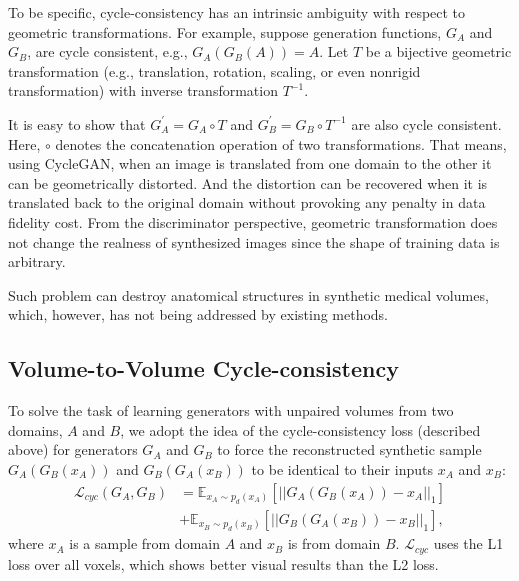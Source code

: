 \documentclass[10pt,twocolumn,letterpaper]{article}
\begin{document}
To be specific, cycle-consistency has an intrinsic ambiguity with respect to geometric transformations.
For example, suppose generation functions, $G_A$ and $G_B$, are cycle consistent, e.g., $G_A(G_B(A)) = A$.
Let $T$ be a bijective geometric transformation (e.g., translation, rotation, scaling, or even nonrigid transformation) with inverse transformation $T^{-1}$.

It is easy to show that $G_A^{'} = G_A \circ T$ and $G_B^{'} = G_B \circ T^{-1}$ are also cycle consistent.
Here, $\circ$ denotes the concatenation operation of two transformations.
That means, using CycleGAN, when an image is translated from one domain to the other it can be geometrically distorted.
And the distortion can be recovered when it is translated back to the original domain without provoking any penalty in data fidelity cost.
From the discriminator perspective, geometric transformation does not change the realness of synthesized images since the shape of training data is arbitrary. 

Such problem can destroy anatomical structures in synthetic medical volumes, which, however, has not being addressed by existing methods.

\subsection{Volume-to-Volume Cycle-consistency}
To solve the task of learning generators with unpaired volumes from two domains, $A$ and $B$, we adopt the idea of the cycle-consistency loss (described above) for generators $G_A$ and $G_B$ to force the reconstructed synthetic sample $G_A(G_B(x_A))$ and $G_B(G_A(x_B))$ to be identical to their inputs $x_A$ and $x_B$:
\begin{equation}
\begin{split}
\mathcal{L}_{cyc}(G_A, G_B) & = \mathbb{E}_{x_A \sim p_{d}(x_A)}[ ||G_A(G_B(x_A)) - x_A||_1 ] \\
& + \mathbb{E}_{x_B \sim p_{d}(x_B)}[ ||G_B(G_A(x_B)) - x_B||_1 ],
\end{split}
\end{equation}
where ${x_A}$ is a sample from domain $A$ and ${x_B}$ is from domain $B$. $\mathcal{L}_{cyc}$ uses the L1 loss over all voxels, which shows better visual results than the L2 loss. 
\end{document}
